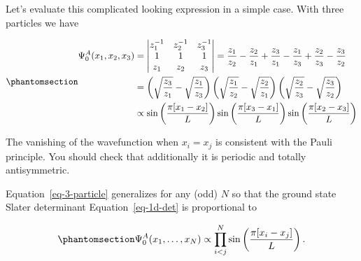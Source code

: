\documentclass[
  letterpaper,
  DIV=11,
  numbers=noendperiod]{scrreprt}
\begin{document}
Let's evaluate this complicated looking expression in a simple case.
With three particles we have

\begin{equation}\phantomsection\label{eq-3-particle}{
\begin{align}
    \Psi^A_0(x_1,x_2,x_3)&=\begin{vmatrix}
        z_{1}^{-1} & z_{2}^{-1} & z_{3}^{-1} \\
        1 & 1 & 1 \\
        z_{1} & z_{2} & z_{3}
    \end{vmatrix} = \frac{z_{1}}{z_{2}}-\frac{z_{2}}{z_{1}}+\frac{z_{3}}{z_{1}}-\frac{z_{1}}{z_{3}}+\frac{z_{2}}{z_{3}}-\frac{z_{3}}{z_{2}}\nonumber\\
    &=\left(\sqrt{\frac{z_{3}}{z_{1}}}-\sqrt{\frac{z_{1}}{z_{3}}}\right)\left(\sqrt{\frac{z_{1}}{z_{2}}}-\sqrt{\frac{z_{2}}{z_{1}}}\right)\left(\sqrt{\frac{z_{2}}{z_{3}}}-\sqrt{\frac{z_{3}}{z_{2}}}\right)  \nonumber\\
    &\propto \sin\left(\frac{ \pi[x_{1}-x_{2}]}{L}\right)\sin\left(\frac{ \pi[x_{3}-x_{1}]}{L}\right)\sin\left(\frac{ \pi[x_{2}-x_{3}]}{L}\right)
\end{align} 
}\end{equation}

The vanishing of the wavefunction when \(x_{i}=x_{j}\) is consistent
with the Pauli principle. You should check that additionally it is
periodic and totally antisymmetric.

Equation~\ref{eq-3-particle} generalizes for any (odd) \(N\) so that the
ground state Slater determinant Equation~\ref{eq-1d-det} is proportional
to

\begin{equation}\phantomsection\label{eq-1d-fermi-gs}{
\Psi^A_0(x_1,\ldots, x_N)\propto\prod_{i<j}^{N} \sin\left(\frac{\pi[x_{i}-x_{j}]}{L}\right).
}\end{equation}
\end{document}

